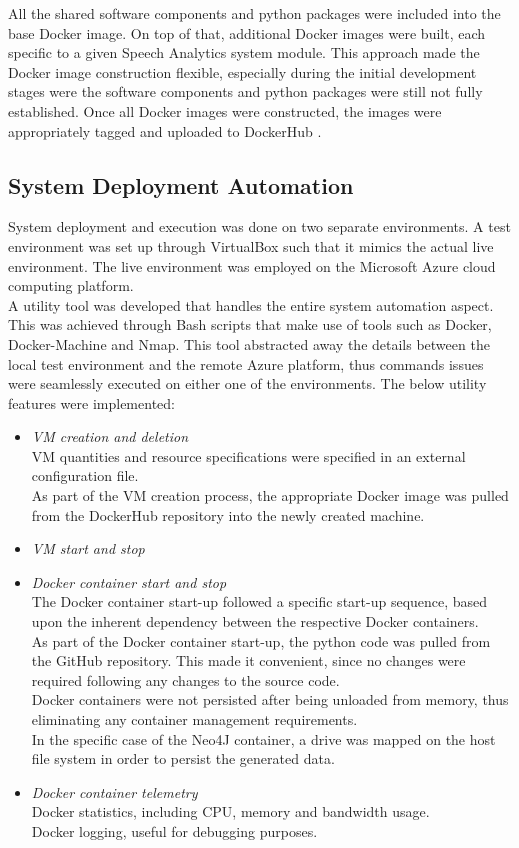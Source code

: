 \documentclass[10pt,conference]{IEEEtran}
\begin{document}
All the shared software components and python packages were included into the base Docker image. On top of that, additional Docker images were built, each specific to a given Speech Analytics system module. This approach made the Docker image construction flexible, especially during the initial development stages were the software components and python packages were still not fully established. Once all Docker images were constructed, the images were appropriately tagged and uploaded to DockerHub \cite{DockerHub}.

\subsection{System Deployment Automation}
System deployment and execution was done on two separate environments. A test environment was set up through VirtualBox \cite{VirtualBox} such that it mimics the actual live environment. The live environment was employed on the Microsoft Azure cloud computing \cite{Azure} platform.
\\
A utility tool was developed that handles the entire system automation aspect. This was achieved through Bash scripts that make use of tools such as Docker, Docker-Machine and Nmap. This tool abstracted away the details between the local test environment and the remote Azure platform, thus commands issues were seamlessly executed on either one of the environments. The below utility features were implemented:
\begin{itemize}
    \item \textit{VM creation and deletion} \\
    VM quantities and resource specifications were specified in an external configuration file. \\
    As part of the VM creation process, the appropriate Docker image was pulled from the DockerHub repository into the newly created machine.
    \item \textit{VM start and stop}
    \item \textit{Docker container start and stop} \\
    The Docker container start-up followed a specific start-up sequence, based upon the inherent dependency between the respective Docker containers. \\
    As part of the Docker container start-up, the python code was pulled from the GitHub repository. This made it convenient, since no changes were required following any changes to the source code. \\
    Docker containers were not persisted after being unloaded from memory, thus eliminating any container management requirements. \\
    In the specific case of the Neo4J container, a drive was mapped on the host file system in order to persist the generated data.
    \item \textit{Docker container telemetry} \\
    Docker statistics, including CPU, memory and bandwidth usage. \\
    Docker logging, useful for debugging purposes.
\end{itemize}
\end{document}
